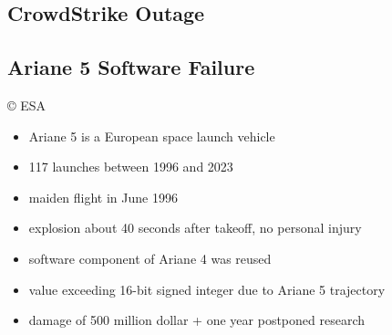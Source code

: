 
\subsection{CrowdStrike Outage} %
\begin{frame}{\insertsubsection}
	\slideCrowdStrike
\end{frame}

\subsection{Ariane 5 Software Failure} %
\begin{frame}{\insertsubsection}
	\begin{fancycolumns}[widths={35}]
	\nextcolumn
		\centering{} {\tiny\copyright{} ESA} %
		\begin{definition}{\insertsubsection{}}
			\begin{itemize}
				\item Ariane 5 is a European space launch vehicle
				\item 117 launches between 1996 and 2023
				\item maiden flight in June 1996
				\item explosion about 40 seconds after takeoff, no personal injury
				\item software component of Ariane 4 was reused
				\item value exceeding 16-bit signed integer due to Ariane 5 trajectory
				\item damage of 500 million dollar + one year postponed research
			\end{itemize}
		\end{definition}
	\end{fancycolumns}
\end{frame}

